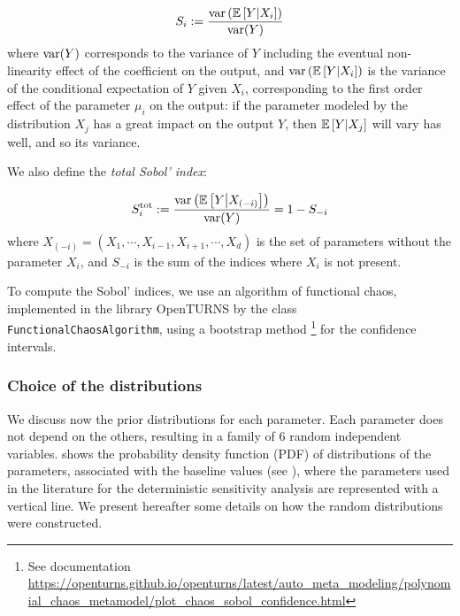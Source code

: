 \begin{equation}
    S_i := \frac{\mathrm{var}\left(\mathbb{E}\left[Y\middle|X_i\right]\right)}{\mathrm{var}(Y)}
\end{equation}
where $\mathrm{var}(Y)$ corresponds to the variance of $Y$ including the eventual non-linearity effect of the coefficient on the output,
and $\mathrm{var}\left(\mathbb{E}\left[Y\middle|X_i\right]\right)$ is the variance of the conditional expectation of $Y$ given $X_i$, corresponding to the first order effect of the parameter $\mu_i$ on the output:
if the parameter modeled by the distribution $X_j$ has a great impact on the output $Y$, then $\mathbb{E}\left[Y\middle|X_j\right]$ will vary has well, and so its variance.

We also define the \emph{total Sobol' index}:

\begin{equation}
    S_i^\text{tot} := \frac{\mathrm{var}\left(\mathbb{E}\left[Y\middle|X_{(-i)}\right]\right)}{\mathrm{var}(Y)} = 1 - S_{-i}
\end{equation}
where $X_{(-i)} = (X_1,\cdots,X_{i-1},X_{i+1},\cdots,X_d)$ is the set of parameters without the parameter $X_i$, and $S_{-i}$ is the sum of the indices where $X_i$ is not present.


To compute the Sobol' indices, we use an algorithm of functional chaos, implemented in the library OpenTURNS \cite{Baudin2016} by the class \texttt{FunctionalChaosAlgorithm}, using a bootstrap method%
\footnote{See documentation \url{https://openturns.github.io/openturns/latest/auto_meta_modeling/polynomial_chaos_metamodel/plot_chaos_sobol_confidence.html}}
for the confidence intervals.



\subsubsection{Choice of the distributions}

We discuss now the prior distributions for each parameter.
Each parameter does not depend on the others, resulting in a family of 6 random independent variables.
 shows the probability density function (PDF) of distributions of the parameters,
associated with the baseline values (see ),
where the parameters used in the literature for the deterministic sensitivity analysis are represented with a vertical line.
We present hereafter some details on how the random distributions were constructed.


